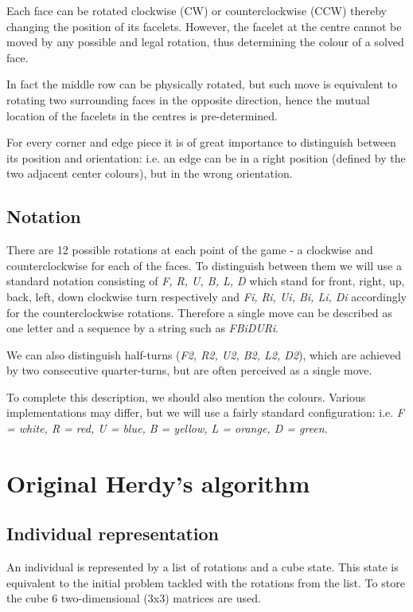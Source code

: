 \documentclass[a4paper]{article}
\begin{document}
Each face can be rotated clockwise (CW) or counterclockwise (CCW) thereby changing the position of its facelets. However, the facelet at the centre cannot be moved by any possible and legal rotation, thus determining the colour of a solved face.

In fact the middle row can be physically rotated, but such move is equivalent to rotating two surrounding faces in the opposite direction, hence the mutual location of the facelets in the centres is pre-determined.

For every corner and edge piece it is of great importance to distinguish between its position and orientation: i.e. an edge can be in a right position (defined by the two adjacent center colours), but in the wrong orientation.

\subsection{Notation}
There are 12 possible rotations at each point of the game - a clockwise and counterclockwise for each of the faces. To distinguish between them we will use a standard notation consisting of \textit{F, R, U, B, L, D}  which stand for front, right, up, back, left, down clockwise turn respectively and \textit{Fi, Ri, Ui, Bi, Li, Di} accordingly for the counterclockwise rotations. Therefore a single move can be described as one letter and a sequence by a string such as \textit{FBiDURi}.

We can also distinguish half-turns (\textit{F2, R2, U2, B2, L2, D2}), which are achieved by two consecutive quarter-turns, but are often perceived as a single move.

To complete this description, we should also mention the colours. Various implementations may differ, but we will use a fairly standard configuration: i.e. \textit{F = white, R = red, U = blue, B = yellow, L = orange, D = green}. 

\section{Original Herdy's algorithm}
\subsection{Individual representation}
An individual is represented by a list of rotations and a cube state. This state is equivalent to the initial problem tackled with the rotations from the list. To store the cube 6 two-dimensional (3x3) matrices are used.
\end{document}
